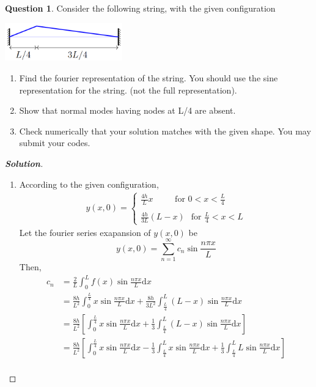 \documentclass[10pt]{scrartcl}
\theoremstyle{definition}
\newtheorem{exercise}{Question}
\newenvironment{solution} {\begin{proof}[\normalfont \textbf{Solution}]} {\end{proof}}
\newcommand{\npixL}{\frac{n\pi x}{L}}
\newcommand{\dx}{\mathrm{d}x}
\begin{document}
\begin{exercise}
    Consider the following string, with the given configuration

    \includegraphics[width = 2.0in]{q2.png}
    \begin{enumerate}[label={(\alph*)}]
        \item Find the fourier representation of the string. You should use the sine representation for the string. (not the full representation).
        \item Show that normal modes having nodes at L/4 are absent.
        \item Check numerically that your solution matches with the given shape. You may submit
        your codes.
    \end{enumerate}
    \begin{solution}
        $ $
        \begin{enumerate}[label={(\alph*)}]
            \item According to the given configuration, 
                \begin{align*}
                    y(x, 0) = 
                    \begin{cases}
                        \frac{4h}{L}x~~~~~~~~~~\text{ for }0<x<\frac{L}{4}\\ 
                        \\
                        \frac{4h}{3L}(L-x)~\,\text{ for }\frac{L}{4}<x<L 
                    \end{cases}
                \end{align*}
                Let the fourier series exapansion of $y(x, 0)$ be
                $$y(x, 0) = \sum_{n=1}^{\infty}c_n \sin \frac{n\pi x}{L}$$
                Then,
                \begin{align*}
                    c_n &=\frac{2}{L} \int_{0}^{L}f(x)\sin\frac{n\pi x}{L}\dx \\ 
                        &= \frac{8h}{L^2}\int_{0}^{\frac{L}{4}}x\sin\npixL \dx + \frac{8h}{3L^2}\int_{\frac{L}{4}}^{L} (L-x)\sin \npixL \dx \\ 
                        &= \frac{8h}{L^2}\left[\int_{0}^{\frac{L}{4}}x\sin\npixL \dx + \frac{1}{3}\int_{\frac{L}{4}}^{L} (L-x)\sin \npixL \dx\right] \\ 
                        &= \frac{8h}{L^2}\left[\int_{0}^{\frac{L}{4}}x\sin\npixL \dx - \frac{1}{3}\int_{\frac{L}{4}}^{L}x\sin \npixL \dx + \frac{1}{3}\int_{\frac{L}{4}}^{L} L\sin\npixL\dx\right] \\ 

\end{align*}
\end{enumerate}
\end{solution}
\end{exercise}
\end{document}

